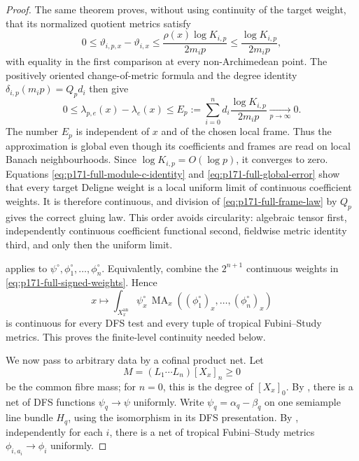 \begin{proof}
The same theorem proves, without using continuity of the target weight,
that its normalized quotient metrics satisfy
\begin{equation}
 0\leq\vartheta_{i,p,x}-\vartheta_{i,x}
 \leq
 \frac{\rho(x)\log K_{i,p}}{2m_ip}
 \leq\frac{\log K_{i,p}}{2m_ip},
 \label{eq:p171-full-softmax}
\end{equation}
with equality in the first comparison at every non-Archimedean point.
The positively oriented change-of-metric formula
\cite[formula~(8.9)]{BE21} and the
degree identity
\(\delta_{i,p}(m_ip)=Q_pd_i\) then give
\begin{equation}
 0\leq\lambda_{p,e}(x)-\lambda_e(x)
 \leq E_p:=\sum_{i=0}^n
 d_i\frac{\log K_{i,p}}{2m_ip}
 \xrightarrow[p\to\infty]{}0.
 \label{eq:p171-full-global-error}
\end{equation}
The number \(E_p\) is independent of \(x\) and of the chosen local frame.
Thus the approximation is global even though its coefficients and frames
are read on local Banach neighbourhoods.  Since
\(\log K_{i,p}=O(\log p)\), it converges to zero.  Equations
\eqref{eq:p171-full-module-c-identity} and
\eqref{eq:p171-full-global-error} show that every target Deligne weight is
a local uniform limit of continuous coefficient weights.  It is therefore
continuous, and division of \eqref{eq:p171-full-frame-law} by \(Q_p\)
gives the correct gluing law.  This order avoids circularity: algebraic
tensor first, independently continuous coefficient functional second,
fieldwise metric identity third, and only then the uniform limit.

 applies to
\(\psi^\circ,\phi_1^\circ,\ldots,\phi_n^\circ\).  Equivalently, combine
the \(2^{n+1}\) continuous weights in
\eqref{eq:p171-full-signed-weights}.  Hence
\begin{equation}
 x\longmapsto
 \int_{X_x^{\mathrm{an}}}\psi_x^\circ\,
 \operatorname{MA}_x
 ((\phi_1^\circ)_x,\ldots,(\phi_n^\circ)_x)
 \label{eq:p171-full-finite-level}
\end{equation}
is continuous for every DFS test and every tuple of tropical
Fubini--Study metrics.  This proves the finite-level continuity needed
below.

We now pass to arbitrary data by a cofinal product net.
Let
\[
 M=(L_1\cdots L_n)[X_x]_n\geq0
\]
be the common fibre mass; for \(n=0\), this is the degree of
\([X_x]_0\).  By \cite[Theorem~2.16]{PS23Hybrid}, there is a net of DFS functions
\(\psi_q\to\psi\) uniformly.  Write
\(\psi_q=\alpha_q-\beta_q\) on one semiample line bundle \(H_q\), using
the isomorphism in its DFS presentation.  By
\cite[Proposition~2.21]{PS23Hybrid}, independently for each \(i\), there is a net of tropical
Fubini--Study metrics
\(\phi_{i,a_i}\to\phi_i\) uniformly.


\end{proof}
